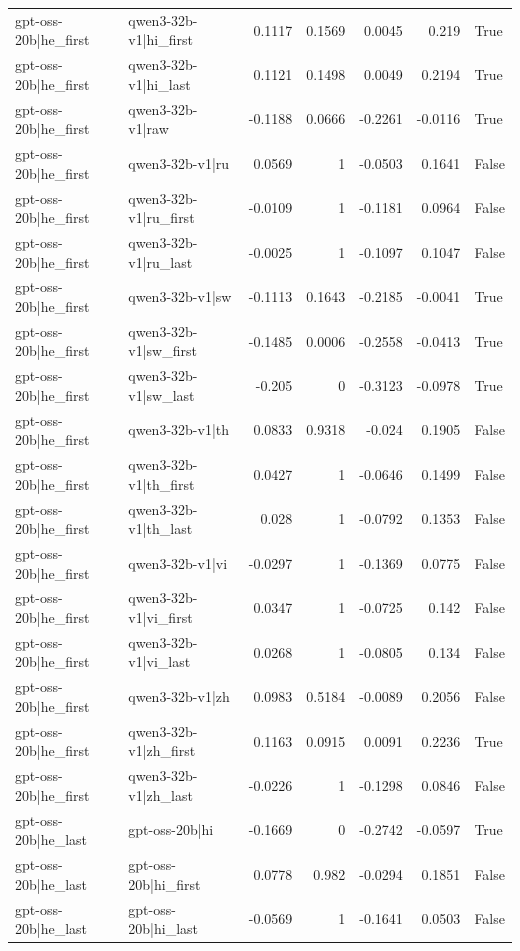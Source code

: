\begin{table}
\begin{tabular}{l l r r r r l}
gpt-oss-20b|he_first & qwen3-32b-v1|hi_first & 0.1117 & 0.1569 & 0.0045 & 0.219 & True \\
gpt-oss-20b|he_first & qwen3-32b-v1|hi_last & 0.1121 & 0.1498 & 0.0049 & 0.2194 & True \\
gpt-oss-20b|he_first & qwen3-32b-v1|raw & -0.1188 & 0.0666 & -0.2261 & -0.0116 & True \\
gpt-oss-20b|he_first & qwen3-32b-v1|ru & 0.0569 & 1 & -0.0503 & 0.1641 & False \\
gpt-oss-20b|he_first & qwen3-32b-v1|ru_first & -0.0109 & 1 & -0.1181 & 0.0964 & False \\
gpt-oss-20b|he_first & qwen3-32b-v1|ru_last & -0.0025 & 1 & -0.1097 & 0.1047 & False \\
gpt-oss-20b|he_first & qwen3-32b-v1|sw & -0.1113 & 0.1643 & -0.2185 & -0.0041 & True \\
gpt-oss-20b|he_first & qwen3-32b-v1|sw_first & -0.1485 & 0.0006 & -0.2558 & -0.0413 & True \\
gpt-oss-20b|he_first & qwen3-32b-v1|sw_last & -0.205 & 0 & -0.3123 & -0.0978 & True \\
gpt-oss-20b|he_first & qwen3-32b-v1|th & 0.0833 & 0.9318 & -0.024 & 0.1905 & False \\
gpt-oss-20b|he_first & qwen3-32b-v1|th_first & 0.0427 & 1 & -0.0646 & 0.1499 & False \\
gpt-oss-20b|he_first & qwen3-32b-v1|th_last & 0.028 & 1 & -0.0792 & 0.1353 & False \\
gpt-oss-20b|he_first & qwen3-32b-v1|vi & -0.0297 & 1 & -0.1369 & 0.0775 & False \\
gpt-oss-20b|he_first & qwen3-32b-v1|vi_first & 0.0347 & 1 & -0.0725 & 0.142 & False \\
gpt-oss-20b|he_first & qwen3-32b-v1|vi_last & 0.0268 & 1 & -0.0805 & 0.134 & False \\
gpt-oss-20b|he_first & qwen3-32b-v1|zh & 0.0983 & 0.5184 & -0.0089 & 0.2056 & False \\
gpt-oss-20b|he_first & qwen3-32b-v1|zh_first & 0.1163 & 0.0915 & 0.0091 & 0.2236 & True \\
gpt-oss-20b|he_first & qwen3-32b-v1|zh_last & -0.0226 & 1 & -0.1298 & 0.0846 & False \\
gpt-oss-20b|he_last & gpt-oss-20b|hi & -0.1669 & 0 & -0.2742 & -0.0597 & True \\
gpt-oss-20b|he_last & gpt-oss-20b|hi_first & 0.0778 & 0.982 & -0.0294 & 0.1851 & False \\
gpt-oss-20b|he_last & gpt-oss-20b|hi_last & -0.0569 & 1 & -0.1641 & 0.0503 & False \\

\end{tabular}
\end{table}
